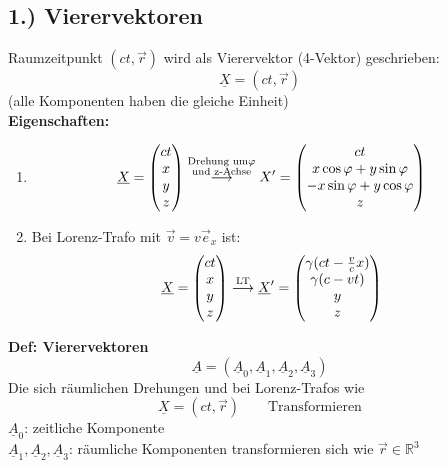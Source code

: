 \documentclass[titlepage,12pt,a4paper,ngerman]{report}
\newcommand{\tx}[1]{\textrm{#1}}
\begin{document}
\subsection{1.) Vierervektoren}
Raumzeitpunkt $ (ct,\vec{r}) $ wird als Vierervektor (4-Vektor) geschrieben:
\begin{equation*}
\underline{X} = (ct, \vec{r}) \tag{1}
\end{equation*}
(alle Komponenten haben die gleiche Einheit)\\
\textbf{Eigenschaften:}\\
\begin{enumerate}[1)]
	\item $$\underline{X} = \begin{pmatrix}
	ct\\
	x\\
	y\\
	z
	\end{pmatrix} \buildrel \substack{\tx{Drehung um} \varphi\\ \tx{und z-Achse}} \over \longrightarrow X' = \begin{pmatrix}
	ct\\x \cos \varphi + y \sin \varphi\\
	-x \sin \varphi + y \cos \varphi\\ z
	\end{pmatrix}$$
	\item Bei Lorenz-Trafo mit $ \vec{v} = v \vec{e}_x$ ist:
	$$\underline{X} = \begin{pmatrix}
	ct\\x\\y\\z
	\end{pmatrix} \buildrel \tx{LT} \over \longrightarrow \underline{X}' = \begin{pmatrix}
	\gamma (ct - \frac{v}{c} x) \\
	\gamma (c - vt) \\
	y \\ z
	\end{pmatrix}$$
\end{enumerate}
\textbf{Def: Vierervektoren}
$$ \underline{A} = (\underline{A}_0,\underline{A}_1,\underline{A}_2,\underline{A}_3)$$
Die sich räumlichen Drehungen und bei Lorenz-Trafos wie
$$\underline{X} = (ct, \vec{r}) \qquad \tx{Transformieren}$$
$ \underline{A}_0 $: zeitliche Komponente\\
$ \underline{A}_1,\underline{A}_2,\underline{A}_3 $: räumliche Komponenten transformieren sich wie $ \vec{r} \in \mathbb{R}^3 $\\[5pt]
\end{document}

